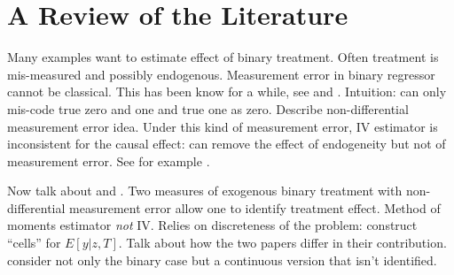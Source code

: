 \section{A Review of the Literature}

Many examples want to estimate effect of binary treatment.
Often treatment is mis-measured and possibly endogenous.
Measurement error in binary regressor cannot be classical.
This has been know for a while, see \cite{Aigner} and \cite{Bollinger}.
Intuition: can only mis-code true zero and one and true one as zero.
Describe non-differential measurement error idea.
Under this kind of measurement error, IV estimator is inconsistent for the causal effect: can remove the effect of endogeneity but not of measurement error.
See for example \cite{KRS,BBS,FL}.


Now talk about \cite{KRS} and \cite{BBS}.
Two measures of exogenous binary treatment with non-differential measurement error allow one to identify treatment effect.
Method of moments estimator \emph{not} IV.
Relies on discreteness of the problem: construct ``cells'' for $E[y|z,T]$.
Talk about how the two papers differ in their contribution.
\cite{BBS} consider not only the binary case but a continuous version that isn't identified.

